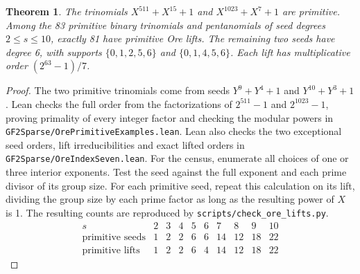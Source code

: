 \documentclass[11pt]{article}
\newtheorem{theorem}{Theorem}
\begin{document}
\begin{theorem}\label{thm:primitive-lifts}
The trinomials \(X^{511}+X^{15}+1\) and \(X^{1023}+X^7+1\) are
primitive. Among the 83 primitive binary trinomials and
pentanomials of seed degrees \(2\le s\le10\), exactly 81 have
primitive Ore lifts. The remaining two seeds have degree 6, with
supports \(\{0,1,2,5,6\}\) and \(\{0,1,4,5,6\}\). Each lift
has multiplicative order \((2^{63}-1)/7\).
\end{theorem}
\begin{proof}
The two primitive trinomials come from seeds \(Y^9+Y^4+1\)
and \(Y^{10}+Y^3+1\). Lean checks the full order from the
factorizations of \(2^{511}-1\) and \(2^{1023}-1\), proving
primality of every integer factor and checking the modular powers in
\nolinkurl{GF2Sparse/OrePrimitiveExamples.lean}. Lean also checks the
two exceptional seed orders, lift irreducibilities and exact lifted
orders in \nolinkurl{GF2Sparse/OreIndexSeven.lean}.
For the census, enumerate all choices of one or three interior
exponents. Test the seed against the full exponent and each prime
divisor of its group size. For each primitive seed, repeat this
calculation on its lift, dividing the group size by each prime
factor as long as the resulting power of \(X\) is 1. The resulting
counts are reproduced by \nolinkurl{scripts/check_ore_lifts.py}.
\[
\begin{array}{c|rrrrrrrrr}
s&2&3&4&5&6&7&8&9&10\\\hline
\text{primitive seeds}&1&2&2&6&6&14&12&18&22\\
\text{primitive lifts}&1&2&2&6&4&14&12&18&22
\end{array}
\]
\end{proof}
\end{document}
